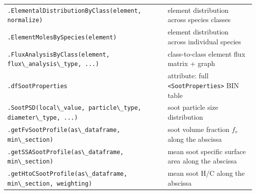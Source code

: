 \documentclass[11pt,a4paper]{report}
\newcommand{\pkg}[1]{\lstinline|#1|}
\begin{document}
\begin{center}
\begin{longtable}{p{6.6cm}p{9cm}}
\pkg{.ElementalDistributionByClass(element, normalize)} & element distribution across species classes \\
\pkg{.ElementMolesBySpecies(element)} & element distribution across individual species \\
\pkg{.FluxAnalysisByClass(element, flux\_analysis\_type, ...)} & class-to-class element flux matrix + graph \\
\pkg{.dfSootProperties} & attribute: full \pkg{<SootProperties>} BIN table \\
\pkg{.SootPSD(local\_value, particle\_type, diameter\_type, ...)} & soot particle size distribution \\
\pkg{.getFvSootProfile(as\_dataframe, min\_section)} & soot volume fraction $f_v$ along the abscissa \\
\pkg{.getSSASootProfile(as\_dataframe, min\_section)} & mean soot specific surface area along the abscissa \\
\pkg{.getHtoCSootProfile(as\_dataframe, min\_section, weighting)} & mean soot H/C along the abscissa \\
\bottomrule
\end{longtable}
\end{center}
\end{document}
